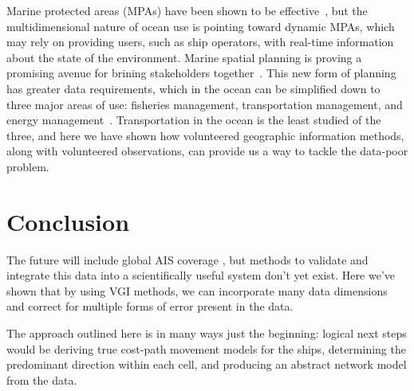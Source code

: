 \documentclass[12pt,letterpaper]{article}
\begin{document}
Marine protected areas (MPAs) have been shown to be effective~\citep{halpern2002marine}, but the multidimensional nature of ocean use is pointing toward dynamic MPAs, which may rely on providing users, such as ship operators, with real-time information about the state of the environment. Marine spatial planning is proving a promising avenue for brining stakeholders together~\citep{merrifield2012marinemap}. This new form of planning has greater data requirements, which in the ocean can be simplified down to three major areas of use: fisheries management, transportation management, and energy management~\citep{Lubchenco2010}. Transportation in the ocean is the least studied of the three, and here we have shown how volunteered geographic information methods, along with volunteered observations, can provide us a way to tackle the data-poor problem.







\section{Conclusion}



The future will include global AIS coverage \cite{JonesGoogle2012,carson2012satellite}, but methods to validate and integrate this data into a scientifically useful system don't yet exist. Here we've shown that by using VGI methods, we can incorporate many data dimensions and correct for multiple forms of error present in the data.

The approach outlined here is in many ways just the beginning: logical next steps would be deriving true cost-path movement models for the ships, determining the predominant direction within each cell, and producing an abstract network model from the data.
\end{document}
